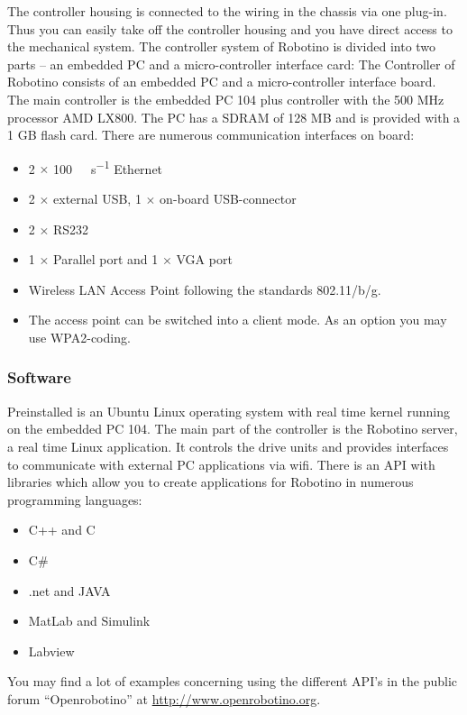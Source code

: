 \documentclass[12pt,twoside]{article}
\begin{document}
\begin{appendix}
The controller housing is connected to the wiring in the chassis via
one plug-in. Thus you can easily take off the controller housing and
you have direct access to the mechanical system. The controller system
of Robotino is divided into two parts – an embedded PC and a
micro-controller interface card: The Controller of Robotino consists of
an embedded PC and a micro-controller interface board. The main
controller is the embedded PC 104 plus controller with the 500 MHz
processor AMD LX800. The PC has a SDRAM of 128 MB and is provided with
a 1 GB flash card. There are numerous communication interfaces on
board:

\begin{itemize}
\item 2 $\times$ \SI[per-mode=symbol]{100}{\mega\bit\per\second} Ethernet
\item 2 $\times$ external USB, 1 $\times$ on-board USB-connector
\item 2 $\times$  RS232
\item 1 $\times$ Parallel port and 1 $\times$ VGA port
\item Wireless LAN Access Point following the standards 802.11/b/g.
\item The access point can be switched into a client mode.  As an
  option you may use WPA2-coding.
\end{itemize}

\subsubsection{Software}
Preinstalled is an Ubuntu Linux operating system with real time kernel
running on the embedded PC 104. The main part of the controller is the
Robotino server, a real time Linux application. It controls the drive
units and provides interfaces to communicate with external PC
applications via wifi. There is an API with libraries which allow you
to create applications for Robotino in numerous programming languages:

\begin{itemize}
	\item C++ and C 
	\item C\# 
	\item .net and JAVA 
	\item MatLab and Simulink
	\item Labview
\end{itemize}

You may find a lot of examples concerning using the different API's in
the public forum ``Openrobotino'' at
\url{http://www.openrobotino.org}.


\end{appendix}
\end{document}
